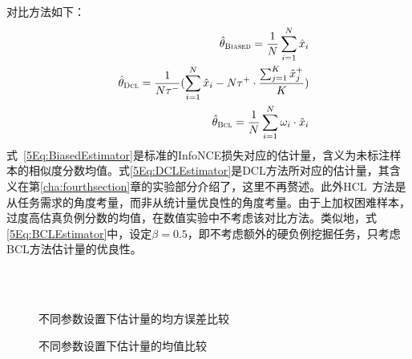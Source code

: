 对比方法如下：
\begin{eqnarray}
	&&\hat{\theta}_\textsc{Biased} =\frac{1}{N} \sum_{i=1}^{N} \hat{x}_i \label{5Eq:BiasedEstimator} \\
	&&\hat{\theta}_\textsc{Dcl} =  \frac{1}{N\tau^-}  (\sum_{i=1}^{N} \hat{x}_i - N\tau^+ \cdot \frac{\sum_{j=1}^{K} \hat{x}_j^+}{K} ) \label{5Eq:DCLEstimator} \\
	&& \hat\theta_\textsc{Bcl} =\frac{1}{N}  \sum_{i=1}^N \omega_i \cdot \hat{x}_i\label{5Eq:BCLEstimator}
\end{eqnarray}
式~\eqref{5Eq:BiasedEstimator}是标准的InfoNCE损失\cite{Oord:2018:arxiv}对应的估计量，含义为未标注样本的相似度分数均值。式\eqref{5Eq:DCLEstimator}是DCL\cite{Chuang:2020:NIPS}方法所对应的估计量，其含义在第\ref{cha:fourthsection}章的实验部分介绍了，这里不再赘述。此外HCL~\cite{Robinson:2021:ICLR}方法是从任务需求的角度考量，而非从统计量优良性的角度考量。由于上加权困难样本，过度高估真负例分数的均值，在数值实验中不考虑该对比方法。类似地，式\eqref{5Eq:BCLEstimator}中，设定$\beta=0.5$，即不考虑额外的硬负例挖掘任务，只考虑BCL方法估计量的优良性。
\begin{figure*}[h!]
	\centering
	\\
	\\
	\caption{不同参数设置下估计量的均方误差比较}
	\label{Fig:MSE}
\end{figure*}

\begin{figure}[h!]
	\centering
	\hspace{0.1cm}
	\caption{不同参数设置下估计量的均值比较}
	\label{fig:numer_bar}
\end{figure}


